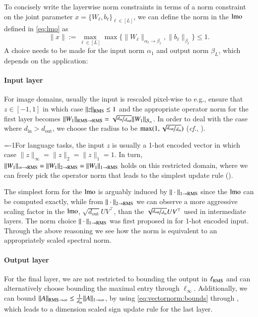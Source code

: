 To concisely write the layerwise norm constraints in terms of a norm constraint on the joint parameter $x=\{W_\ell,b_\ell\}_{\ell\in [L]}$, we can define the norm in the $\operatorname{lmo}$ defined in \eqref{eq:lmo} as
\begin{equation*}
\|x\| := \max_{\ell\in[L]} \max \{\|W_\ell\|_{\alpha_\ell \rightarrow \beta_\ell}, \|b_\ell\|_{\beta_\ell} \}\leq 1.
\end{equation*}
A choice needs to be made for the input norm $\alpha_1$ and output norm $\beta_L$, which depends on the application:


\paragraph{Input layer}
For image domains, usually the input is rescaled pixel-wise to e.g., ensure that $z \in [-1,1]$ in which case $\|z\|_{\mathrm{RMS}}\leq 1$ and the appropriate operator norm for the first layer becomes $\|W_1\|_{\mathrm{RMS} \rightarrow \mathrm{RMS}}=\sqrt{\nicefrac{d_\mathrm{in}}{d_\mathrm{out}}}\|W_1\|_{{\mathcal S}_\infty}$. In order to deal with the case where $d_\mathrm{in} > d_\mathrm{out}$, we choose the radius to be $\max(1,\sqrt{\nicefrac{d_\mathrm{out}}{d_\mathrm{in}}})$ (\textit{cf.}, ).

\looseness=-1For language tasks, the input $z$ is usually a 1-hot encoded vector in which case $\|z\|_\infty=\|z\|_2=\|z\|_1=1$.
In turn, $\|W_1\|_{\infty \rightarrow \mathrm{RMS}}=\|W_1\|_{2 \rightarrow \mathrm{RMS}}=\|W_1\|_{1 \rightarrow \mathrm{RMS}}$ holds on this restricted domain, where we can freely pick the operator norm that leads to the simplest update rule ().

The simplest form for the $\operatorname{lmo}$ is arguably induced by $\|\cdot\|_{1 \rightarrow \mathrm{RMS}}$ since the $\operatorname{lmo}$ can be computed exactly, while from $\|\cdot\|_{2 \rightarrow \mathrm{RMS}}$ we can observe a more aggressive scaling factor in the $\operatorname{lmo}$, $\sqrt{d_{\mathrm{out}}}UV^\top$, than the $\sqrt{\nicefrac{d_{\mathrm{out}}}{d_{\mathrm{in}}}}UV^\top$ used in  intermediate layers.
The norm choice $\|\cdot\|_{1 \rightarrow \mathrm{RMS}}$ was first proposed in \citet{large2024scalable} for 1-hot encoded input.
Through the above reasoning we see how the norm is equivalent to an appropriately scaled spectral norm.

\paragraph{Output layer}
For the final layer, we are not restricted to bounding the output in $\ell_{\mathrm{RMS}}$ and can alternatively choose bounding the maximal entry through $\ell_\infty$.
Additionally, we can bound $\|A\|_{\mathrm{RMS} \rightarrow \infty} \leq \tfrac{1}{d_\mathrm{in}}\|A\|_{1 \rightarrow \infty}$, by using \eqref{eq:vectornorm:bounds} through , which leads to a dimension scaled sign update rule for the last layer.


